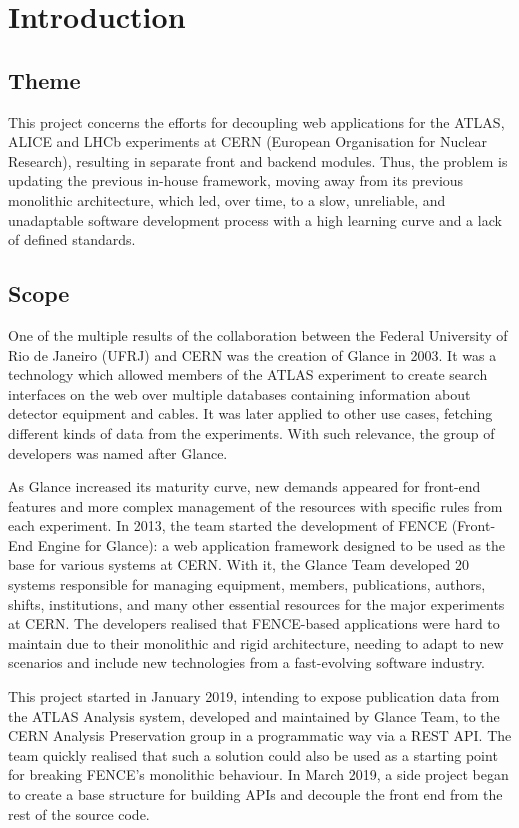 \chapter{Introduction}
\label{chap1}

\section{Theme}

This project concerns the efforts for decoupling web applications for the ATLAS, ALICE and LHCb experiments at CERN (European Organisation for Nuclear Research), resulting in separate front and backend modules. Thus, the problem is updating the previous in-house framework, moving away from its previous monolithic architecture, which led, over time, to a slow, unreliable, and unadaptable software development process with a high learning curve and a lack of defined standards. 

\section{Scope}

One of the multiple results of the collaboration between the Federal University of Rio de Janeiro (UFRJ) and CERN was the creation of Glance in 2003. It was a technology which allowed members of the ATLAS experiment to create search interfaces on the web over multiple databases containing information about detector equipment and cables. It was later applied to other use cases, fetching different kinds of data from the experiments. With such relevance, the group of developers was named after Glance.

As Glance increased its maturity curve, new demands appeared for front-end features and more complex management of the resources with specific rules from each experiment. In 2013, the team started the development of FENCE (Front-End Engine for Glance): a web application framework designed to be used as the base for various systems at CERN. With it, the Glance Team developed 20 systems responsible for managing equipment, members, publications, authors, shifts, institutions, and many other essential resources for the major experiments at CERN. The developers realised that FENCE-based applications were hard to maintain due to their monolithic and rigid architecture, needing to adapt to new scenarios and include new technologies from a fast-evolving software industry.

This project started in January 2019, intending to expose publication data from the ATLAS Analysis system, developed and maintained by Glance Team, to the CERN Analysis Preservation group in a programmatic way via a REST API. The team quickly realised that such a solution could also be used as a starting point for breaking FENCE’s monolithic behaviour. In March 2019, a side project began to create a base structure for building APIs and decouple the front end from the rest of the source code.

